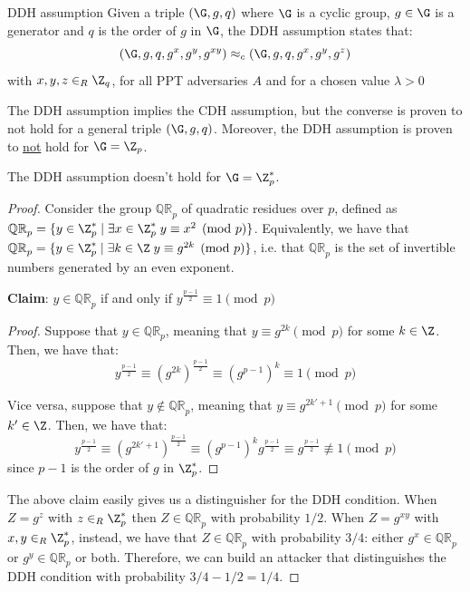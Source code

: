 \documentclass[a4paper, 12pt]{report}
\begin{document}
    \begin{framedass}{DDH assumption}
        Given a triple $(\G,g,q)$ where $\G$ is a cyclic group, $g \in \G$ is a generator and $q$ is the order of $g$ in $\G$, the DDH assumption states that:
        \[(\G,g,q,g^x,g^y, g^{xy}) \approx_c (\G,g,q,g^x,g^y, g^{z})\]
        with $x,y,z \in_R \Z_q$, for all PPT adversaries $A$ and for a chosen value $\lambda > 0$
    \end{framedass}

    The DDH assumption implies the CDH assumption, but the converse is proven to not hold for a general triple $(\G,g,q)$. Moreover, the DDH assumption is proven to \underline{not} hold for $\G = \Z_p$. 

    \begin{framedprop}{}
        The DDH assumption doesn't hold for $\G = \Z_p^*$.
    \end{framedprop}

    \begin{proof}
        Consider the group $\mathbb{QR}_p$ of quadratic residues over $p$, defined as $\mathbb{QR}_p = \{y \in \Z_p^* \mid \exists x \in \Z_p^* \; y \equiv x^2 \pmod p\}$. Equivalently, we have that $\mathbb{QR}_p = \{y \in \Z_p^* \mid \exists k \in \Z \; y \equiv g^{2k} \pmod p\}$, i.e. that $\mathbb{QR}_p$ is the set of invertible numbers generated by an even exponent.

        \textbf{Claim}: $y \in \mathbb{QR}_p$ if and only if $y^{\frac{p-1}{2}} \equiv 1 \pmod p$

        \begin{proof}
            Suppose that $y \in \mathbb{QR}_p$, meaning that $y \equiv g^{2k} \pmod p$ for some $k \in \Z$. Then, we have that:
            \[y^{\frac{p-1}{2}} \equiv (g^{2k})^{\frac{p-1}{2}} \equiv (g^{p-1})^k \equiv 1 \pmod p\]

            Vice versa, suppose that $y \notin \mathbb{QR}_p$, meaning that $y \equiv g^{2k'+1} \pmod p$ for some $k' \in \Z$. Then, we have that:
            \[y^{\frac{p-1}{2}} \equiv (g^{2k'+1})^{\frac{p-1}{2}} \equiv (g^{p-1})^k g^{\frac{p-1}{2}} \equiv g^{\frac{p-1}{2}} \not\equiv 1 \pmod p\]
            since $p-1$ is the order of $g$ in $\Z_p^*$.
        \end{proof}

        The above claim easily gives us a distinguisher for the DDH condition. When $Z = g^z$ with $z \in_R \Z_p^*$ then $Z \in \mathbb{QR}_p$ with probability $1/2$. When $Z = g^{xy}$ with $x,y \in_R \Z_p^*$, instead, we have that $Z \in \mathbb{QR}_p$ with probability $3/4$: either $g^x \in \mathbb{QR}_p$ or $g^y \in \mathbb{QR}_p$ or both. Therefore, we can build an attacker that distinguishes the DDH condition with probability $3/4 - 1/2 = 1/4$.
    \end{proof}
\end{document}
